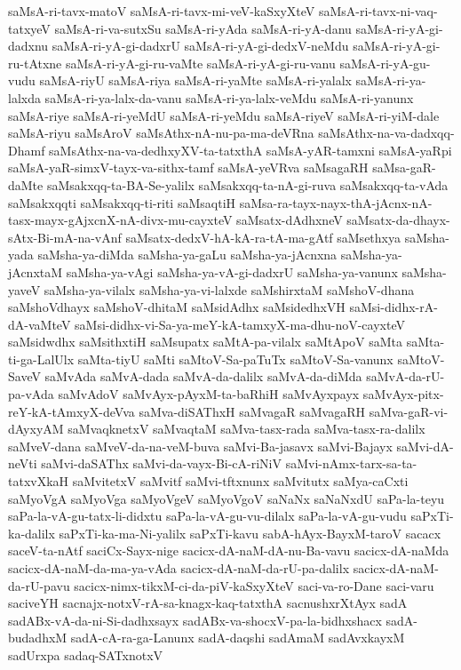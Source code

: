 {saMsA-ri-tavx-matoV
saMsA-ri-tavx-mi-veV-kaSxyXteV
saMsA-ri-tavx-ni-vaq-tatxyeV
saMsA-ri-va-sutxSu
saMsA-ri-yAda
saMsA-ri-yA-danu
saMsA-ri-yA-gi-dadxnu
saMsA-ri-yA-gi-dadxrU
saMsA-ri-yA-gi-dedxV-neMdu
saMsA-ri-yA-gi-ru-tAtxne
saMsA-ri-yA-gi-ru-vaMte
saMsA-ri-yA-gi-ru-vanu
saMsA-ri-yA-gu-vudu
saMsA-riyU
saMsA-riya
saMsA-ri-yaMte
saMsA-ri-yalalx
saMsA-ri-ya-lalxda
saMsA-ri-ya-lalx-da-vanu
saMsA-ri-ya-lalx-veMdu
saMsA-ri-yanunx
saMsA-riye
saMsA-ri-yeMdU
saMsA-ri-yeMdu
saMsA-riyeV
saMsA-ri-yiM-dale
saMsA-riyu
saMsAroV
saMsAthx-nA-nu-pa-ma-deVRna
saMsAthx-na-va-dadxqq-Dhamf
saMsAthx-na-va-dedhxyXV-ta-tatxthA
saMsA-yAR-tamxni
saMsA-yaRpi
saMsA-yaR-simxV-tayx-va-sithx-tamf
saMsA-yeVRva
saMsagaRH
saMsa-gaR-daMte
saMsakxqq-ta-BA-Se-yalilx
saMsakxqq-ta-nA-gi-ruva
saMsakxqq-ta-vAda
saMsakxqqti
saMsakxqq-ti-riti
saMsaqtiH
saMsa-ra-tayx-nayx-thA-jAcnx-nA-tasx-mayx-gAjxcnX-nA-divx-mu-cayxteV
saMsatx-dAdhxneV
saMsatx-da-dhayx-sAtx-Bi-mA-na-vAnf
saMsatx-dedxV-hA-kA-ra-tA-ma-gAtf
saMsethxya
saMsha-yada
saMsha-ya-diMda
saMsha-ya-gaLu
saMsha-ya-jAcnxna
saMsha-ya-jAcnxtaM
saMsha-ya-vAgi
saMsha-ya-vA-gi-dadxrU
saMsha-ya-vanunx
saMsha-yaveV
saMsha-ya-vilalx
saMsha-ya-vi-lalxde
saMshirxtaM
saMshoV-dhana
saMshoVdhayx
saMshoV-dhitaM
saMsidAdhx
saMsidedhxVH
saMsi-didhx-rA-dA-vaMteV
saMsi-didhx-vi-Sa-ya-meY-kA-tamxyX-ma-dhu-noV-cayxteV
saMsidwdhx
saMsithxtiH
saMsupatx
saMtA-pa-vilalx
saMtApoV
saMta
saMta-ti-ga-LalUlx
saMta-tiyU
saMti
saMtoV-Sa-paTuTx
saMtoV-Sa-vanunx
saMtoV-SaveV
saMvAda
saMvA-dada
saMvA-da-dalilx
saMvA-da-diMda
saMvA-da-rU-pa-vAda
saMvAdoV
saMvAyx-pAyxM-ta-baRhiH
saMvAyxpayx
saMvAyx-pitx-reY-kA-tAmxyX-deVva
saMva-diSAThxH
saMvagaR
saMvagaRH
saMva-gaR-vi-dAyxyAM
saMvaqknetxV
saMvaqtaM
saMva-tasx-rada
saMva-tasx-ra-dalilx
saMveV-dana
saMveV-da-na-veM-buva
saMvi-Ba-jasavx
saMvi-Bajayx
saMvi-dA-neVti
saMvi-daSAThx
saMvi-da-vayx-Bi-cA-riNiV
saMvi-nAmx-tarx-sa-ta-tatxvXkaH
saMvitetxV
saMvitf
saMvi-tftxnunx
saMvitutx
saMya-caCxti
saMyoVgA
saMyoVga
saMyoVgeV
saMyoVgoV
saNaNx
saNaNxdU
saPa-la-teyu
saPa-la-vA-gu-tatx-li-didxtu
saPa-la-vA-gu-vu-dilalx
saPa-la-vA-gu-vudu
saPxTi-ka-dalilx
saPxTi-ka-ma-Ni-yalilx
saPxTi-kavu
sabA-hAyx-BayxM-taroV
sacacx
saceV-ta-nAtf
saciCx-Sayx-nige
sacicx-dA-naM-dA-nu-Ba-vavu
sacicx-dA-naMda
sacicx-dA-naM-da-ma-ya-vAda
sacicx-dA-naM-da-rU-pa-dalilx
sacicx-dA-naM-da-rU-pavu
sacicx-nimx-tikxM-ci-da-piV-kaSxyXteV
saci-va-ro-Dane
saci-varu
saciveYH
sacnajx-notxV-rA-sa-knagx-kaq-tatxthA
sacnushxrXtAyx
sadA
sadABx-vA-da-ni-Si-dadhxsayx
sadABx-va-shocxV-pa-la-bidhxshacx
sadA-budadhxM
sadA-cA-ra-ga-Lanunx
sadA-daqshi
sadAmaM
sadAvxkayxM
sadUrxpa
sadaq-SATxnotxV
}
